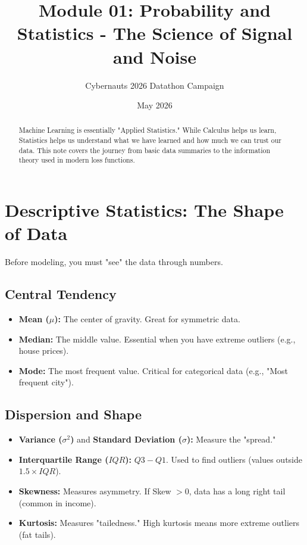 \documentclass{article}
\title{Module 01: Probability and Statistics - The Science of Signal and Noise}
\author{Cybernauts 2026 Datathon Campaign}
\date{May 2026}
\begin{document}
\maketitle

\begin{abstract}
Machine Learning is essentially "Applied Statistics." While Calculus helps us learn, Statistics helps us understand what we have learned and how much we can trust our data. This note covers the journey from basic data summaries to the information theory used in modern loss functions.
\end{abstract}

\tableofcontents
\newpage

\section{Descriptive Statistics: The Shape of Data}
Before modeling, you must "see" the data through numbers.

\subsection{Central Tendency}
\begin{itemize}
    \item \textbf{Mean ($\mu$):} The center of gravity. Great for symmetric data.
    \item \textbf{Median:} The middle value. Essential when you have extreme outliers (e.g., house prices).
    \item \textbf{Mode:} The most frequent value. Critical for categorical data (e.g., "Most frequent city").
\end{itemize}

\subsection{Dispersion and Shape}
\begin{itemize}
    \item \textbf{Variance ($\sigma^2$)} and \textbf{Standard Deviation ($\sigma$):} Measure the "spread."
    \item \textbf{Interquartile Range ($IQR$):} $Q3 - Q1$. Used to find outliers (values outside $1.5 \times IQR$).
    \item \textbf{Skewness:} Measures asymmetry. If Skew $> 0$, data has a long right tail (common in income).
    \item \textbf{Kurtosis:} Measures "tailedness." High kurtosis means more extreme outliers (fat tails).
\end{itemize}
\end{document}
